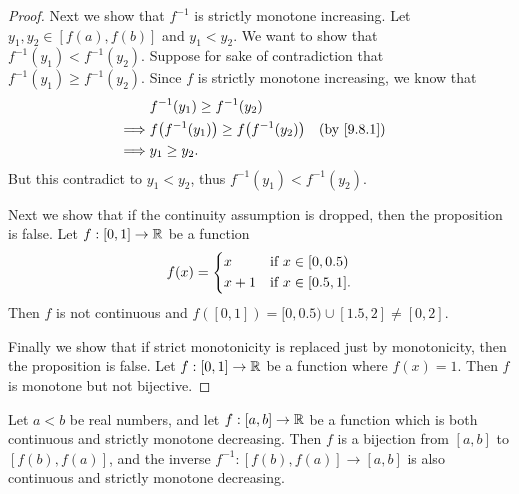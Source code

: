 \begin{proof}
  Next we show that \(f^{-1}\) is strictly monotone increasing.
  Let \(y_1, y_2 \in [f(a), f(b)]\) and \(y_1 < y_2\).
  We want to show that \(f^{-1}(y_1) < f^{-1}(y_2)\).
  Suppose for sake of contradiction that \(f^{-1}(y_1) \geq f^{-1}(y_2)\).
  Since \(f\) is strictly monotone increasing, we know that
  \begin{align*}
             & f^{-1}(y_1) \geq f^{-1}(y_2)                                       \\
    \implies & f\big(f^{-1}(y_1)\big) \geq f\big(f^{-1}(y_2)\big) &  & \by{9.8.1} \\
    \implies & y_1 \geq y_2.
  \end{align*}
  But this contradict to \(y_1 < y_2\), thus \(f^{-1}(y_1) < f^{-1}(y_2)\).

  Next we show that if the continuity assumption is dropped, then the proposition is false.
  Let \(f : [0, 1] \to \mathbb{R}\) be a function
  \[
    f(x) = \begin{dcases}
      x     & \text{if } x \in [0, 0.5)  \\
      x + 1 & \text{if } x \in [0.5, 1].
    \end{dcases}
  \]
  Then \(f\) is not continuous and \(f([0, 1]) = [0, 0.5) \cup [1.5, 2] \neq [0, 2]\).

  Finally we show that if strict monotonicity is replaced just by monotonicity, then the proposition is false.
  Let \(f : [0, 1] \to \mathbb{R}\) be a function where \(f(x) = 1\).
  Then \(f\) is monotone but not bijective.
\end{proof}

\begin{ac}\label{ac:9.8.1}
  Let \(a < b\) be real numbers, and let \(f : [a, b] \to \mathbb{R}\) be a function which is both continuous and strictly monotone decreasing.
  Then \(f\) is a bijection from \([a, b]\) to \([f(b), f(a)]\), and the inverse \(f^{-1} : [f(b), f(a)] \to [a, b]\) is also continuous and strictly monotone decreasing.
\end{ac}

